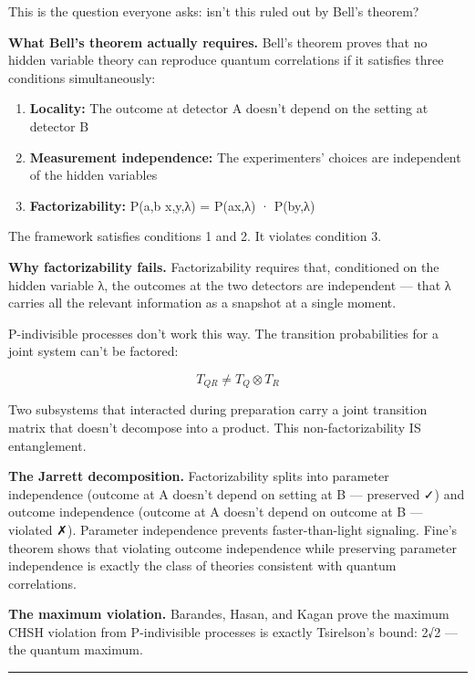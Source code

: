 \documentclass[
]{article}
\providecommand{\tightlist}{%
  \setlength{\itemsep}{0pt}\setlength{\parskip}{0pt}}
\begin{document}
This is the question everyone asks: isn't this ruled out by Bell's
theorem?

\textbf{What Bell's theorem actually requires.} Bell's theorem proves
that no hidden variable theory can reproduce quantum correlations if it
satisfies three conditions simultaneously:

\begin{enumerate}
\def\labelenumi{\arabic{enumi}.}
\tightlist
\item
  \textbf{Locality:} The outcome at detector A doesn't depend on the
  setting at detector B
\item
  \textbf{Measurement independence:} The experimenters' choices are
  independent of the hidden variables
\item
  \textbf{Factorizability:} P(a,b \textbar{} x,y,λ) = P(a\textbar x,λ) ·
  P(b\textbar y,λ)
\end{enumerate}

The framework satisfies conditions 1 and 2. It violates condition 3.

\textbf{Why factorizability fails.} Factorizability requires that,
conditioned on the hidden variable λ, the outcomes at the two detectors
are independent --- that λ carries all the relevant information as a
snapshot at a single moment.

P-indivisible processes don't work this way. The transition
probabilities for a joint system can't be factored:

\[T_{QR} \neq T_Q \otimes T_R\]

Two subsystems that interacted during preparation carry a joint
transition matrix that doesn't decompose into a product. This
non-factorizability IS entanglement.

\textbf{The Jarrett decomposition.} Factorizability splits into
parameter independence (outcome at A doesn't depend on setting at B ---
preserved ✓) and outcome independence (outcome at A doesn't depend on
outcome at B --- violated ✗). Parameter independence prevents
faster-than-light signaling. Fine's theorem shows that violating outcome
independence while preserving parameter independence is exactly the
class of theories consistent with quantum correlations.

\textbf{The maximum violation.} Barandes, Hasan, and Kagan prove the
maximum CHSH violation from P-indivisible processes is exactly
Tsirelson's bound: 2√2 --- the quantum maximum.

\begin{center}\rule{0.5\linewidth}{0.5pt}\end{center}
\end{document}
